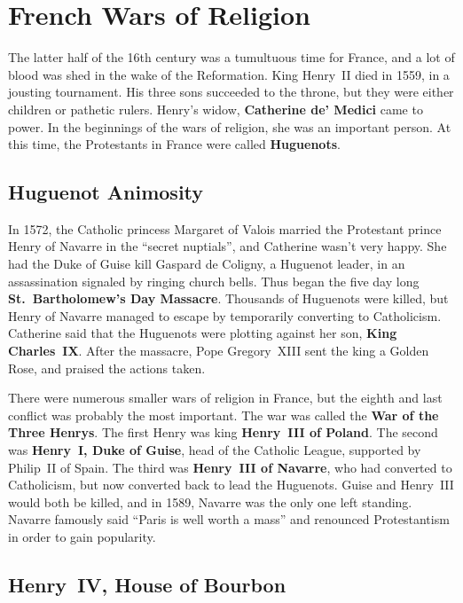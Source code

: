 \section{French Wars of Religion}

The latter half of the 16th century was a tumultuous time for France,
and a lot of blood was shed in the wake of the Reformation.
King Henry~II died in 1559, in a jousting tournament.
His three sons succeeded to the throne, but they were either children or pathetic rulers.
Henry's widow, \textbf{Catherine de' Medici} came to power.
In the beginnings of the wars of religion, she was an important person.
At this time, the Protestants in France were called \textbf{Huguenots}.

\subsection*{Huguenot Animosity}

In 1572, the Catholic princess Margaret of Valois married
the Protestant prince Henry of Navarre in the ``secret nuptials'', and Catherine wasn't very happy.
She had the Duke of Guise kill Gaspard de Coligny, a Huguenot leader,
in an assassination signaled by ringing church bells.
Thus began the five day long \textbf{St.\ Bartholomew's Day Massacre}.
Thousands of Huguenots were killed, but Henry of Navarre managed to escape by temporarily converting to Catholicism.
Catherine said that the Huguenots were plotting against her son, \textbf{King Charles~IX}\@.
After the massacre, Pope Gregory~XIII sent the king a Golden Rose, and praised the actions taken.

There were numerous smaller wars of religion in France, but the eighth and last conflict was probably the most important.
The war was called the \textbf{War of the Three Henrys}.
The first Henry was king \textbf{Henry~III of Poland}.
The second was \textbf{Henry~I, Duke of Guise}, head of the Catholic League, supported by Philip~II of Spain.
The third was \textbf{Henry~III of Navarre}, who had converted to Catholicism,
but now converted back to lead the Huguenots.
Guise and Henry~III would both be killed, and in 1589, Navarre was the only one left standing.
Navarre famously said ``Paris is well worth a mass'' and renounced Protestantism in order to gain popularity.

\subsection*{Henry~IV, House of Bourbon}

